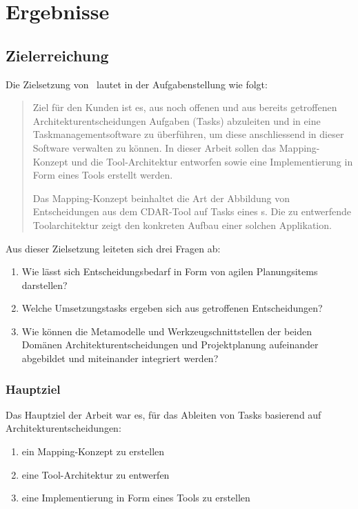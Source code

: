 \chapter{Ergebnisse}
	
	\section{Zielerreichung}
		Die Zielsetzung von \eeppi\ lautet in der Aufgabenstellung wie folgt:
		\begin{quote}
			Ziel für den Kunden ist es, aus noch offenen und aus bereits getroffenen Architekturentscheidungen  Aufgaben (Tasks) abzuleiten und in eine Taskmanagementsoftware zu überführen, um diese anschliessend in dieser Software verwalten zu können. In dieser Arbeit sollen das Mapping-Konzept und die Tool-Architektur entworfen sowie eine Implementierung in Form eines Tools erstellt werden.
			
			Das Mapping-Konzept beinhaltet die Art der Abbildung von Entscheidungen aus dem CDAR-Tool auf Tasks eines \ppt s. Die zu entwerfende Toolarchitektur zeigt den konkreten Aufbau einer solchen Applikation.
		\end{quote}
	Aus dieser Zielsetzung leiteten sich drei Fragen ab:
	\begin{enumerate}
		\item{Wie lässt sich Entscheidungsbedarf in Form von agilen Planungsitems darstellen?}
		\item{Welche Umsetzungstasks ergeben sich aus getroffenen Entscheidungen?}
		\item{Wie können die Metamodelle und Werkzeugschnittstellen der beiden Domänen Architekturentscheidungen und Projektplanung aufeinander abgebildet und miteinander integriert werden?}
	\end{enumerate}
	
	\subsection{Hauptziel}
		Das Hauptziel der Arbeit war es, für das Ableiten von Tasks basierend auf Architekturentscheidungen:
		\begin{enumerate}
			\item{ein Mapping-Konzept zu erstellen}
			\item{eine Tool-Architektur zu entwerfen}
			\item{eine Implementierung in Form eines Tools zu erstellen}
		\end{enumerate}
		
